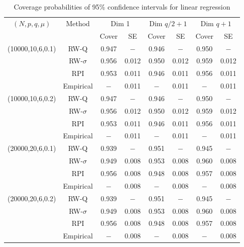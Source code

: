 \documentclass[twoside,11pt]{article}
\begin{document}
\begin{table}[!h]
	\centering
	\caption{Coverage probabilities of 95\% confidence intervals for linear regression}
	\medskip
	\label{tab:sim1}
	\begin{tabular}{cccccccc}
		\hline
		$(N, p, q, \mu)$ & Method & \multicolumn{2}{c}{Dim 1} & \multicolumn{2}{c}{Dim $q/2+1$} & \multicolumn{2}{c}{Dim $q+1$}\\
		& & Cover& SE& Cover& SE & Cover& SE\\
		\hline
		\hline
		(10000,10,6,0.1) & RW-Q & 0.947& $-$& 0.946& $-$&0.950 & $-$\\
		& RW-$\sigma$ & 0.956&0.012 &0.950 & 0.012&0.959 & 0.012\\
		& RPI & 0.953&0.011 &0.946& 0.011&0.956& 0.011\\
		& Empirical & $-$& 0.011&$-$ & 0.011&$-$& 0.011\\
		\hline
		(10000,10,6,0.2)  & RW-Q & 0.947&$-$  &0.946&$-$ &0.950& $-$\\
		& RW-$\sigma$ & 0.956 & 0.012&0.950  & 0.012&0.959 &0.012\\
		& RPI & 0.953 &0.011 &0.946 & 0.011& 0.956& 0.011\\
		& Empirical & $-$& 0.011&$-$ & 0.011&$-$& 0.011\\
		\hline
		(20000,20,6,0.1) & RW-Q & 0.939 & $-$&0.951 &$-$ &0.945&$-$\\
		& RW-$\sigma$ & 0.949 &0.008 &0.953 &0.008 &0.960&0.008\\
		& RPI & 0.956& 0.008& 0.948 & 0.008&0.957 &0.008\\
		& Empirical & $-$& 0.008&$-$ & 0.008&$-$& 0.008\\
		\hline
		(20000,20,6,0.2) & RW-Q & 0.939&$-$& 0.951&$-$& 0.945&$-$\\
		& RW-$\sigma$ &0.949 & 0.008&0.953 &0.008 &0.960&0.008\\
		& RPI & 0.956& 0.008& 0.948 & 0.008& 0.957& 0.008\\
		& Empirical & $-$& 0.008&$-$ & 0.008&$-$& 0.008\\
		\hline
	\end{tabular}
\end{table}
\end{document}
